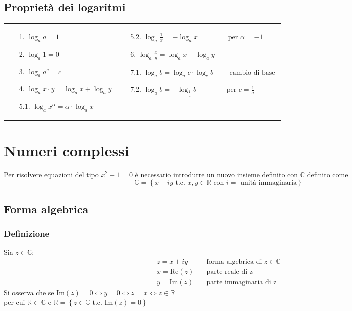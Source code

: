 \documentclass[a4paper]{article}
\newcommand\Real{\text{Re}}
\newcommand\Img{\text{Im}}
\begin{document}
\subsection{Proprietà dei logaritmi}
\begin{center}
	\begin{tabular}{m{6cm} m{8cm}}
		\begin{itemize}
			\item[1.] \(\log_a a = 1\)
			\item[2.] \(\log_a 1 = 0\)
			\item[3.] \(\log_a a^c = c\)
			\item[4.] \(\log_a x \cdot y = \log_a x + \log_a y\)
			\item[5.1.] \(\log_a x^\alpha = \alpha \cdot \log_a x\)
		\end{itemize}
		&
		\begin{itemize}
			\item[5.2.] \(\displaystyle \log_a \frac{1}{x} = - \log_a x \qquad \qquad \text{ per } \alpha = -1\)
			\item[6.] \(\displaystyle \log_a \frac{x}{y} = \log_a x - \log_a y\)
			\item[7.1.] \(\log_a b = \log_a c \cdot \log_c b \qquad \text{ cambio di base } \)
			\item[7.2.] \(\displaystyle \log_a b = - \log_\frac{1}{a} b \qquad \qquad \text{ per } c = \frac{1}{a}\)
		\end{itemize}
	\end{tabular}
\end{center}

\newpage

\section{Numeri complessi}
Per risolvere equazioni del tipo \(x^2 + 1  = 0\) è necessario introdurre un nuovo insieme definito con \(\mathbb{C}\) definito come
\[\mathbb{C} = \left\{ x + i y \text{ t.c. } x,y \in \mathbb{R} \text{ con \(i =\) unità immaginaria} \right\}\]

\subsection{Forma algebrica}
\subsubsection*{Definizione}
Sia \(z \in \mathbb{C}\):
\begin{align*}
	z = x + i y \quad & \text{forma algebrica di \(z \in \mathbb{C}\)} \\
	x = \Real(z) \quad & \text{parte reale di z} \\
	y = \Img(z) \quad & \text{parte immaginaria di z}
\end{align*}
Si osserva che se \(\Img(z) = 0 \Leftrightarrow y = 0 \Leftrightarrow z = x \Leftrightarrow z \in \mathbb{R}\) \\
per cui \(\mathbb{R} \subset \mathbb{C}\) e \(\mathbb{R} = \left\{ z \in \mathbb{C} \text{ t.c. } \Img(z) = 0 \right\}\)
\end{document}
